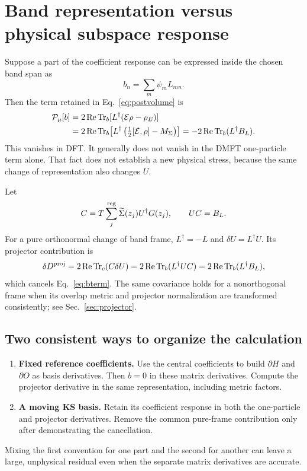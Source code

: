 \documentclass[11pt]{article}
\newcommand{\Tr}{\operatorname{Tr}}
\newcommand{\Rea}{\operatorname{Re}}
\newcommand{\Es}{\mathcal E}
\newcommand{\Sig}{\widetilde\Sigma}
\newcommand{\rE}{{\rho_E}}
\newcommand{\newpart}[1]{\par\Needspace{12\baselineskip}\section{#1}}
\begin{document}
\newpart{Band representation versus physical subspace response}
\label{sec:representation}
Suppose a part of the coefficient response can be expressed inside the
chosen band span as
\begin{equation}
 b_n=\sum_m\psi_m L_{mn}.
\end{equation}
Then the term retained in Eq.~\eqref{eq:postvolume} is
\begin{align}
 \mathcal P_\mu[b]
 &=2\Rea\Tr_b[L^\dagger(\Es\rho-\rE)]\notag\\
 &=2\Rea\Tr_b\!\left[L^\dagger
           \left(\tfrac12[\Es,\rho]-M_\Sigma\right)\right]
 =-2\Rea\Tr_b(L^\dagger B_L).
 \label{eq:bterm}
\end{align}
This vanishes in DFT. It generally does not vanish in the DMFT
one-particle term alone. That fact does not establish a new physical
stress, because the same change of representation also changes $U$.

Let
\begin{equation}
 C=T\sum_j^{\rm reg}\Sig(z_j)U^\dagger G(z_j),\qquad
 UC=B_L.
 \label{eq:C}
\end{equation}
For a pure orthonormal change of band frame, $L^\dagger=-L$ and
$\delta U=L^\dagger U$. Its projector contribution is
\begin{equation}
 \delta D^{\rm proj}=2\Rea\Tr_c(C\delta U)
      =2\Rea\Tr_b(L^\dagger UC)
      =2\Rea\Tr_b(L^\dagger B_L),
 \label{eq:gaugecancel}
\end{equation}
which cancels Eq.~\eqref{eq:bterm}. The same covariance holds for a
nonorthogonal frame when its overlap metric and projector normalization
are transformed consistently; see Sec.~\ref{sec:projector}.

\subsection{Two consistent ways to organize the calculation}
\begin{enumerate}
\item \textbf{Fixed reference coefficients.} Use the central coefficients
      to build $\partial H$ and $\partial O$ as basis derivatives.
      Then $b=0$ in these matrix derivatives. Compute the projector
      derivative in the same representation, including metric factors.
\item \textbf{A moving KS basis.} Retain its coefficient response in both
      the one-particle and projector derivatives. Remove the common
      pure-frame contribution only after demonstrating the cancellation.
\end{enumerate}
Mixing the first convention for one part and the second for another
can leave a large, unphysical residual even when the separate matrix
derivatives are accurate.
\end{document}
